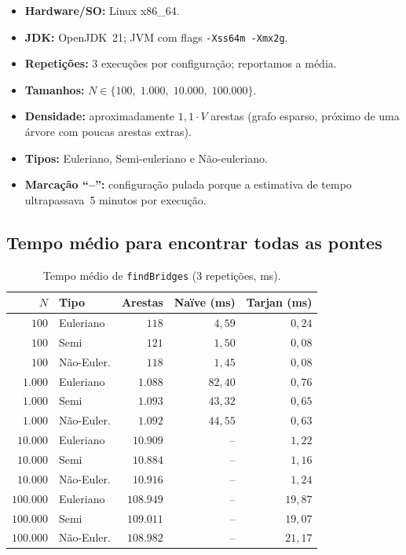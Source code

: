 \documentclass[12pt]{article}
\begin{document}
\begin{itemize}
    \item \textbf{Hardware/SO:} Linux x86\_64.
    \item \textbf{JDK:} OpenJDK~21; JVM com flags \texttt{-Xss64m -Xmx2g}.
    \item \textbf{Repetições:} 3 execuções por configuração; reportamos a
          média.
    \item \textbf{Tamanhos:} $N \in \{100,\; 1.000,\; 10.000,\; 100.000\}$.
    \item \textbf{Densidade:} aproximadamente $1{,}1 \cdot V$ arestas
          (grafo esparso, próximo de uma árvore com poucas arestas extras).
    \item \textbf{Tipos:} Euleriano, Semi-euleriano e Não-euleriano.
    \item \textbf{Marcação ``--'':} configuração pulada porque a estimativa
          de tempo ultrapassava~5 minutos por execução.
\end{itemize}

\subsection{Tempo médio para encontrar todas as pontes}

\begin{table}[H]
\centering
\caption{Tempo médio de \texttt{findBridges} (3 repetições, ms).}
\label{tab:bridges}
\begin{tabular}{rlrrr}
\toprule
$N$ & Tipo & Arestas & Naïve (ms) & Tarjan (ms) \\
\midrule
$100$       & Euleriano     & $118$     & $4{,}59$    & $0{,}24$ \\
$100$       & Semi          & $121$     & $1{,}50$    & $0{,}08$ \\
$100$       & Não-Euler.    & $118$     & $1{,}45$    & $0{,}08$ \\
\midrule
$1.000$     & Euleriano     & $1.088$   & $82{,}40$   & $0{,}76$ \\
$1.000$     & Semi          & $1.093$   & $43{,}32$   & $0{,}65$ \\
$1.000$     & Não-Euler.    & $1.092$   & $44{,}55$   & $0{,}63$ \\
\midrule
$10.000$    & Euleriano     & $10.909$  & --          & $1{,}22$ \\
$10.000$    & Semi          & $10.884$  & --          & $1{,}16$ \\
$10.000$    & Não-Euler.    & $10.916$  & --          & $1{,}24$ \\
\midrule
$100.000$   & Euleriano     & $108.949$ & --          & $19{,}87$ \\
$100.000$   & Semi          & $109.011$ & --          & $19{,}07$ \\
$100.000$   & Não-Euler.    & $108.982$ & --          & $21{,}17$ \\
\bottomrule
\end{tabular}
\end{table}
\end{document}
